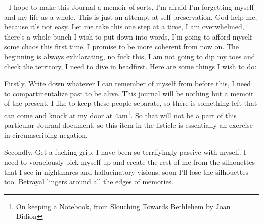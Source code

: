 \noindent {}
-
\noindent I hope to make this Journal a memoir of sorts, I'm afraid I'm forgetting myself and my life as a whole. This is just an attempt at self-preservation. God help me, because it's not easy. Let me take this one step at a time, I am overwhelmed, there's a whole bunch I wish to put down into words, I'm going to afford myself some chaos this first time, I promise to be more coherent from now on. The beginning is always exhilarating, no fuck this, I am not going to dip my toes and check the territory, I need to dive in headfirst. Here are some things I wish to do: 

Firstly, Write down whatever I can remember of myself from before this, I need to compartmentalize past to be alive. This journal will be nothing but a memoir of the present. I like to keep these people separate, so there is something left that can come and knock at my door at 4am\footnote{On keeping a Notebook, from Slouching Towards Bethlehem by Joan Didion}. So that will not be a part of this particular Journal document, so this item in the listicle is essentially an exercise in circumscribing negation.

Secondly, Get a fucking grip. I have been so terrifyingly passive with myself. I need to voraciously pick myself up and create the rest of me from the silhouettes that I see in nightmares and hallucinatory visions, soon I'll lose the silhouettes too. Betrayal lingers around all the edges of memories.

